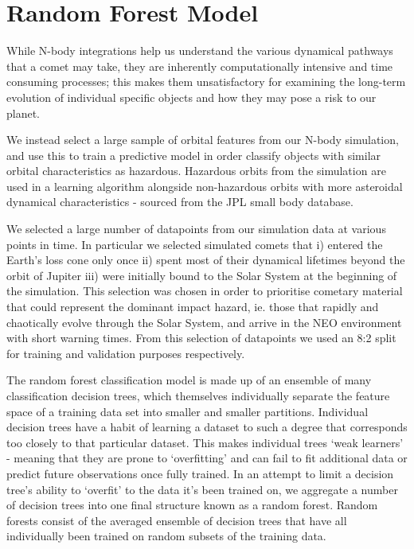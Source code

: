 \section{Random Forest Model}

While N-body integrations help us understand the various dynamical pathways that a comet may take, they are inherently computationally intensive and time consuming processes; this makes them unsatisfactory for examining the long-term evolution of individual specific objects and how they may pose a risk to our planet.

We instead select a large sample of orbital features from our N-body simulation, and use this to train a predictive model in order classify objects with similar orbital characteristics as hazardous. Hazardous orbits from the simulation are used in a learning algorithm alongside non-hazardous orbits with more asteroidal dynamical characteristics - sourced from the JPL small body database.

We selected a large number of datapoints from our simulation data at various points in time. In particular we selected simulated comets that i) entered the Earth's loss cone only once ii) spent most of their dynamical lifetimes beyond the orbit of Jupiter iii) were initially bound to the Solar System at the beginning of the simulation. This selection was chosen in order to prioritise cometary material that could represent the dominant impact hazard, ie. those that rapidly and chaotically evolve through the Solar System, and arrive in the NEO environment with short warning times. From this selection of datapoints we used an 8:2 split for training and validation purposes respectively.

The random forest classification model is made up of an ensemble of many classification decision trees, which themselves individually separate the feature space of a training data set into smaller and smaller partitions. Individual decision trees have a habit of learning a dataset to such a degree that corresponds too closely to that particular dataset. This makes individual trees `weak learners' - meaning that they are prone to `overfitting' and can fail to fit additional data or predict future observations once fully trained. In an attempt to limit a decision tree's ability to `overfit' to the data it's been trained on, we aggregate a number of decision trees into one final structure known as a random forest. Random forests consist of the averaged ensemble of decision trees that have all individually been trained on random subsets of the training data.

